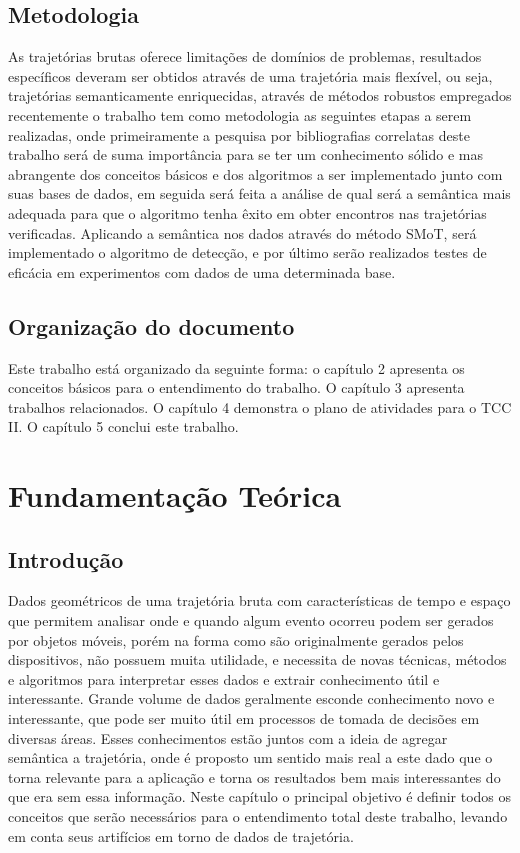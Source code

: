 \documentclass[	12pt, Times, openright, twoside, a4paper, english, brazil]{abntex2}
\begin{document}
\section{Metodologia}
As trajetórias brutas oferece limitações de domínios de problemas, resultados específicos deveram ser obtidos através de uma trajetória mais flexível, ou seja, trajetórias semanticamente enriquecidas, através de métodos robustos empregados recentemente o trabalho tem como metodologia as seguintes etapas a serem realizadas, onde primeiramente a pesquisa por bibliografias correlatas deste trabalho será de suma importância para se ter um conhecimento sólido e mas abrangente dos conceitos básicos e dos algoritmos a ser implementado junto com suas bases de dados, em seguida será feita a análise de qual será a semântica mais adequada para que o algoritmo tenha êxito em obter encontros nas trajetórias verificadas. Aplicando a semântica nos dados através do método SMoT, será implementado o algoritmo de detecção, e por último serão realizados testes de eficácia em experimentos com dados de uma determinada base.

\section{Organização do documento}
Este trabalho está organizado da seguinte forma: o capítulo 2 apresenta os conceitos básicos para o entendimento do trabalho. O capítulo 3 apresenta trabalhos relacionados. O capítulo 4 demonstra o plano de atividades para o TCC II. O capítulo 5 conclui este trabalho.
\chapter{Fundamentação Teórica}
\section{Introdução}
Dados geométricos de uma trajetória bruta com características de tempo e espaço que permitem analisar onde e quando algum evento ocorreu podem ser gerados por objetos móveis, porém na forma como são originalmente gerados pelos dispositivos, não possuem muita utilidade, e necessita de novas técnicas, métodos e algoritmos para interpretar esses dados e extrair conhecimento útil e interessante. Grande volume de dados geralmente esconde conhecimento novo e interessante, que pode ser muito útil em processos de tomada de decisões em diversas áreas. Esses conhecimentos estão juntos com a ideia de agregar semântica a trajetória, onde é proposto um sentido mais real a este dado que o torna relevante para a aplicação e torna os resultados bem mais interessantes do que era sem essa informação. Neste capítulo o principal objetivo é definir todos os conceitos que serão necessários para o entendimento total deste trabalho, levando em conta seus artifícios em torno de dados de trajetória.
\end{document}
